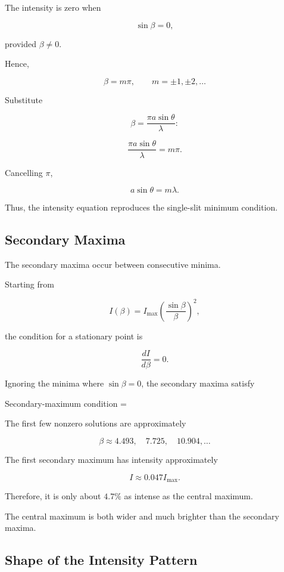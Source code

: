 \documentclass{studentnotes}
\begin{document}
The intensity is zero when

\[
    \sin\beta=0,
\]

provided \(\beta\neq0\).

Hence,

\[
    \beta=m\pi,
    \qquad
    m=\pm1,\pm2,\ldots
\]

Substitute

\[
    \beta
    =
    \frac{\pi a\sin\theta}{\lambda}:
\]

\[
    \frac{\pi a\sin\theta}{\lambda}=m\pi.
\]

Cancelling \(\pi\),

\[
    a\sin\theta=m\lambda.
\]

Thus, the intensity equation reproduces the single-slit minimum condition.

\subsection{Secondary Maxima}

The secondary maxima occur between consecutive minima.

Starting from

\[
    I(\beta)
    =
    I_{\max}
        {\left(
            \frac{\sin\beta}{\beta}
            \right)}^2,
\]

the condition for a stationary point is

\[
    \frac{dI}{d\beta}=0.
\]

Ignoring the minima where \(\sin\beta=0\), the secondary maxima satisfy

\begin{namedformula}{Secondary-maximum condition}
    \tan\beta=\beta%
\end{namedformula}

The first few nonzero solutions are approximately

\[
    \beta
    \approx
    4.493,\quad
    7.725,\quad
    10.904,\ldots
\]

The first secondary maximum has intensity approximately

\[
    I\approx0.047I_{\max}.
\]

Therefore, it is only about \(4.7\%\) as intense as the central maximum.

\begin{importantnote}
    The central maximum is both wider and much brighter than the secondary maxima.
\end{importantnote}

\subsection{Shape of the Intensity Pattern}
\end{document}
